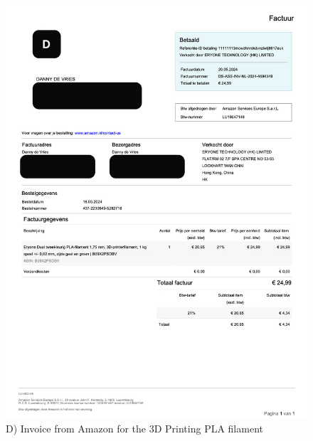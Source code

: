 \documentclass[a4paper]{article}
\begin{document}
\begin{figure}[h]
    \centering
    \includegraphics[width=1\textwidth]{filament_pla.jpg}
    \caption{D) Invoice from Amazon for the 3D Printing PLA filament}
    \label{fig:mesh1}
\end{figure}
\end{document}
